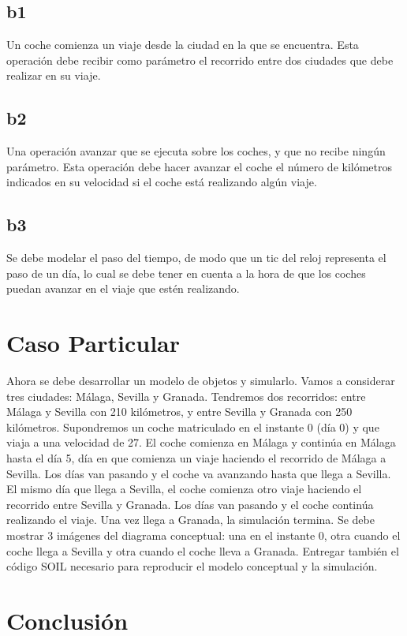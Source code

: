 \documentclass[12pt.a4paper]{article}
\begin{document}
\subsection{b1}
Un coche comienza un viaje desde la ciudad en la que se encuentra. Esta operación debe recibir como parámetro el recorrido entre dos ciudades que debe realizar en su viaje.

\subsection{b2}
Una operación avanzar que se ejecuta sobre los coches, y que no recibe ningún parámetro. Esta operación debe hacer avanzar el coche el número de kilómetros indicados en su velocidad si el coche está realizando algún viaje.

\subsection{b3}
Se debe modelar el paso del tiempo, de modo que un tic del reloj representa el paso de un día, lo cual se debe tener en cuenta a la hora de que los coches puedan avanzar en el viaje que estén realizando.

\newpage
\section{Caso Particular}
Ahora se debe desarrollar un modelo de objetos y simularlo. Vamos a considerar tres ciudades: Málaga, Sevilla y Granada. Tendremos dos recorridos: entre Málaga y Sevilla con 210 kilómetros, y entre Sevilla y Granada con 250 kilómetros. Supondremos un coche matriculado en el instante 0 (día 0) y que viaja a una velocidad de 27. El coche comienza en Málaga y continúa en Málaga hasta el día 5, día en que comienza un viaje haciendo el recorrido de Málaga a Sevilla. Los días van pasando y el coche va avanzando hasta que llega a Sevilla. El mismo día que llega a Sevilla, el coche comienza otro viaje haciendo el recorrido entre Sevilla y Granada. Los días van pasando y el coche continúa realizando el viaje. Una vez llega a Granada, la simulación termina.
Se debe mostrar 3 imágenes del diagrama conceptual: una en el instante 0, otra cuando el coche llega a Sevilla y otra cuando el coche lleva a Granada. Entregar también el código SOIL necesario para reproducir el modelo conceptual y la simulación.


\newpage
\section{Conclusión}
\lipsum[]
\end{document}
